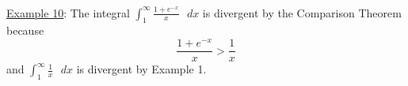 \documentclass[paper=a4, fontsize=11pt]{scrartcl} %
\numberwithin{equation}{section} %
\numberwithin{figure}{section} %
\numberwithin{table}{section} %
\newcommand{\ds}{\displaystyle}
\begin{document}
\indent\\
\indent

\underline{Example 10}: The integral $\ds\int_1^{\infty} \ds\frac{1+e^{-x}}{x}\text{ }dx$ is divergent by the Comparison Theorem because
\[\ds\frac{1+e^{-x}}{x} > \ds\frac{1}{x}\]
and $\ds\int_1^{\infty}\ds\frac{1}{x}\text{ }dx$ is divergent by Example 1.\\




















\end{document}
